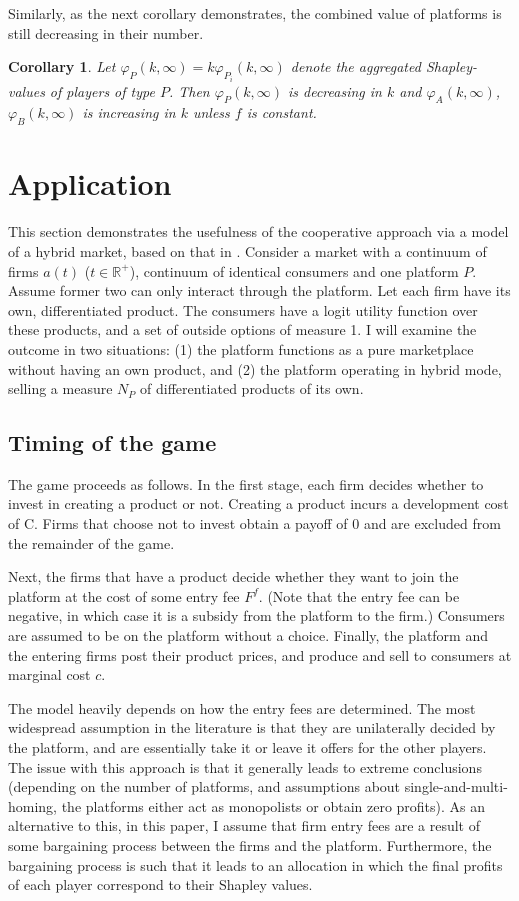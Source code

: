 \documentclass[a4paper]{article}
\newtheorem{corollary}{Corollary}
\begin{document}
Similarly, as the next corollary demonstrates, the combined value of platforms is still decreasing in their number.
\begin{corollary}
    Let $\varphi_{P}(k, \infty) = k\varphi_{P_i}(k, \infty)$ denote the aggregated Shapley-values of players of type $P$. Then $\varphi_{P}(k, \infty)$ is decreasing in $k$ and $\varphi_{A}(k, \infty)$, $\varphi_{B}(k, \infty)$ is increasing in $k$ unless $f$ is constant.
\end{corollary}


\section{Application}

This section demonstrates the usefulness of the cooperative approach via a model of a hybrid market, based on that in \textcite[]{anderson2021hybrid}. Consider a market with a continuum of firms $a(t)$ ($t \in \mathbb{R}^+$), continuum of identical consumers and one platform $P$. Assume former two can only interact through the platform. Let each firm have its own, differentiated product. The consumers have a logit utility function over these products, and a set of outside options of measure 1. I will examine the outcome in two situations: (1) the platform functions as a pure marketplace without having an own product, and (2) the platform operating in hybrid mode, selling a measure $N_P$ of differentiated products of its own. 

\subsection{Timing of the game}

The game proceeds as follows. In the first stage, each firm decides whether to invest in creating a product or not. Creating a product incurs a development cost of C. Firms that choose not to invest obtain a payoff of 0 and are excluded from the remainder of the game.

Next, the firms that have a product decide whether they want to join the platform at the cost of some entry fee $F^f$. (Note that the entry fee can be negative, in which case it is a subsidy from the platform to the firm.) Consumers are assumed to be on the platform without a choice. Finally, the platform and the entering firms post their product prices, and produce and sell to consumers at marginal cost $c$.

The model heavily depends on how the entry fees are determined. The most widespread assumption in the literature is that they are unilaterally decided by the platform, and are essentially take it or leave it offers for the other players. The issue with this approach is that it generally leads to extreme conclusions (depending on the number of platforms, and assumptions about single-and-multi-homing, the platforms either act as monopolists or obtain zero profits). As an alternative to this, in this paper, I assume that firm entry fees are a result of some bargaining process between the firms and the platform. Furthermore, the bargaining process is such that it leads to an allocation in which the final profits of each player correspond to their Shapley values.
\end{document}
